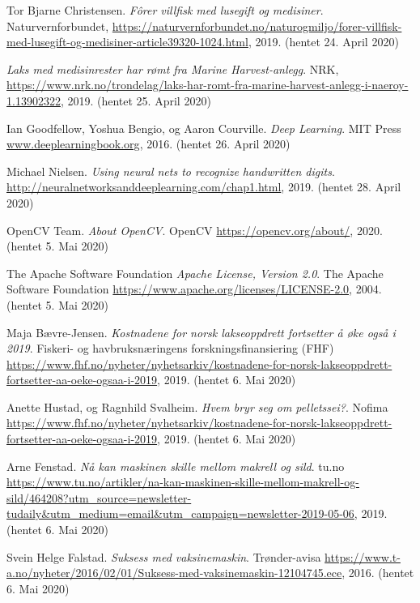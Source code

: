 \documentclass[11ot]{article}
\begin{document}
\begin{thebibliography}{9}
Tor Bjarne Christensen. 
\textit{Fôrer villfisk med lusegift og medisiner}. 
Naturvernforbundet, \url{https://naturvernforbundet.no/naturogmiljo/forer-villfisk-med-lusegift-og-medisiner-article39320-1024.html}, 2019. (hentet 24. April 2020)

\textit{Laks med medisinrester har rømt fra Marine Harvest-anlegg}. 
NRK, \url{https://www.nrk.no/trondelag/laks-har-romt-fra-marine-harvest-anlegg-i-naeroy-1.13902322}, 2019. (hentet 25. April 2020)

Ian Goodfellow, Yoshua Bengio, og Aaron Courville. 
\textit{Deep Learning}. 
MIT Press \url{www.deeplearningbook.org}, 2016. (hentet 26. April 2020)

Michael Nielsen. 
\textit{Using neural nets to recognize handwritten digits}. 
\url{http://neuralnetworksanddeeplearning.com/chap1.html}, 2019. (hentet 28. April 2020)

OpenCV Team. 
\textit{About OpenCV}. 
OpenCV \url{https://opencv.org/about/}, 2020. (hentet 5. Mai 2020)

The Apache Software Foundation 
\textit{Apache License, Version 2.0}. 
The Apache Software Foundation \url{https://www.apache.org/licenses/LICENSE-2.0}, 2004. (hentet 5. Mai 2020)

Maja Bævre-Jensen.
\textit{Kostnadene for norsk lakseoppdrett fortsetter å øke også i 2019}. 
Fiskeri- og havbruksnæringens forskningsfinansiering (FHF) \url{https://www.fhf.no/nyheter/nyhetsarkiv/kostnadene-for-norsk-lakseoppdrett-fortsetter-aa-oeke-ogsaa-i-2019}, 2019. (hentet 6. Mai 2020)

Anette Hustad, og Ragnhild Svalheim.
\textit{Hvem bryr seg om pelletssei?}. 
Nofima \url{https://www.fhf.no/nyheter/nyhetsarkiv/kostnadene-for-norsk-lakseoppdrett-fortsetter-aa-oeke-ogsaa-i-2019}, 2019. (hentet 6. Mai 2020)

Arne Fenstad.
\textit{Nå kan maskinen skille mellom makrell og sild}. 
tu.no \url{https://www.tu.no/artikler/na-kan-maskinen-skille-mellom-makrell-og-sild/464208?utm_source=newsletter-tudaily&utm_medium=email&utm_campaign=newsletter-2019-05-06}, 2019. (hentet 6. Mai 2020)

Svein Helge Falstad.
\textit{Suksess med vaksinemaskin}. 
Trønder-avisa \url{https://www.t-a.no/nyheter/2016/02/01/Suksess-med-vaksinemaskin-12104745.ece}, 2016. (hentet 6. Mai 2020)


\end{thebibliography}
\end{document}
